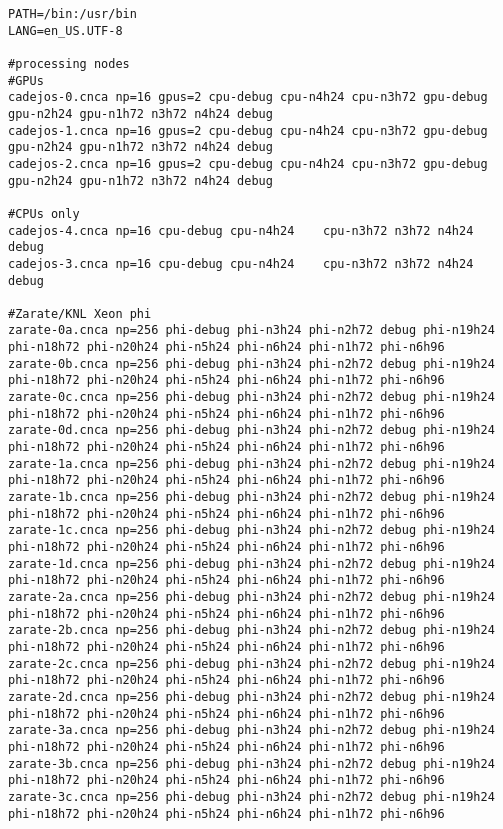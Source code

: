\begin{lstlisting}
PATH=/bin:/usr/bin
LANG=en_US.UTF-8

#processing nodes
#GPUs
cadejos-0.cnca np=16 gpus=2 cpu-debug cpu-n4h24 cpu-n3h72 gpu-debug gpu-n2h24 gpu-n1h72 n3h72 n4h24 debug
cadejos-1.cnca np=16 gpus=2 cpu-debug cpu-n4h24	cpu-n3h72 gpu-debug gpu-n2h24 gpu-n1h72 n3h72 n4h24 debug
cadejos-2.cnca np=16 gpus=2 cpu-debug cpu-n4h24	cpu-n3h72 gpu-debug gpu-n2h24 gpu-n1h72 n3h72 n4h24 debug

#CPUs only
cadejos-4.cnca np=16 cpu-debug cpu-n4h24	cpu-n3h72 n3h72 n4h24 debug
cadejos-3.cnca np=16 cpu-debug cpu-n4h24	cpu-n3h72 n3h72 n4h24 debug

#Zarate/KNL Xeon phi
zarate-0a.cnca np=256 phi-debug phi-n3h24 phi-n2h72 debug phi-n19h24 phi-n18h72 phi-n20h24 phi-n5h24 phi-n6h24 phi-n1h72 phi-n6h96
zarate-0b.cnca np=256 phi-debug phi-n3h24 phi-n2h72 debug phi-n19h24 phi-n18h72 phi-n20h24 phi-n5h24 phi-n6h24 phi-n1h72 phi-n6h96
zarate-0c.cnca np=256 phi-debug phi-n3h24 phi-n2h72 debug phi-n19h24 phi-n18h72 phi-n20h24 phi-n5h24 phi-n6h24 phi-n1h72 phi-n6h96
zarate-0d.cnca np=256 phi-debug phi-n3h24 phi-n2h72 debug phi-n19h24 phi-n18h72 phi-n20h24 phi-n5h24 phi-n6h24 phi-n1h72 phi-n6h96
zarate-1a.cnca np=256 phi-debug phi-n3h24 phi-n2h72 debug phi-n19h24 phi-n18h72 phi-n20h24 phi-n5h24 phi-n6h24 phi-n1h72 phi-n6h96
zarate-1b.cnca np=256 phi-debug phi-n3h24 phi-n2h72 debug phi-n19h24 phi-n18h72 phi-n20h24 phi-n5h24 phi-n6h24 phi-n1h72 phi-n6h96
zarate-1c.cnca np=256 phi-debug phi-n3h24 phi-n2h72 debug phi-n19h24 phi-n18h72 phi-n20h24 phi-n5h24 phi-n6h24 phi-n1h72 phi-n6h96
zarate-1d.cnca np=256 phi-debug phi-n3h24 phi-n2h72 debug phi-n19h24 phi-n18h72 phi-n20h24 phi-n5h24 phi-n6h24 phi-n1h72 phi-n6h96
zarate-2a.cnca np=256 phi-debug phi-n3h24 phi-n2h72 debug phi-n19h24 phi-n18h72 phi-n20h24 phi-n5h24 phi-n6h24 phi-n1h72 phi-n6h96
zarate-2b.cnca np=256 phi-debug phi-n3h24 phi-n2h72 debug phi-n19h24 phi-n18h72 phi-n20h24 phi-n5h24 phi-n6h24 phi-n1h72 phi-n6h96
zarate-2c.cnca np=256 phi-debug phi-n3h24 phi-n2h72 debug phi-n19h24 phi-n18h72 phi-n20h24 phi-n5h24 phi-n6h24 phi-n1h72 phi-n6h96
zarate-2d.cnca np=256 phi-debug phi-n3h24 phi-n2h72 debug phi-n19h24 phi-n18h72 phi-n20h24 phi-n5h24 phi-n6h24 phi-n1h72 phi-n6h96
zarate-3a.cnca np=256 phi-debug phi-n3h24 phi-n2h72 debug phi-n19h24 phi-n18h72 phi-n20h24 phi-n5h24 phi-n6h24 phi-n1h72 phi-n6h96
zarate-3b.cnca np=256 phi-debug phi-n3h24 phi-n2h72 debug phi-n19h24 phi-n18h72 phi-n20h24 phi-n5h24 phi-n6h24 phi-n1h72 phi-n6h96
zarate-3c.cnca np=256 phi-debug phi-n3h24 phi-n2h72 debug phi-n19h24 phi-n18h72 phi-n20h24 phi-n5h24 phi-n6h24 phi-n1h72 phi-n6h96

\end{lstlisting}
